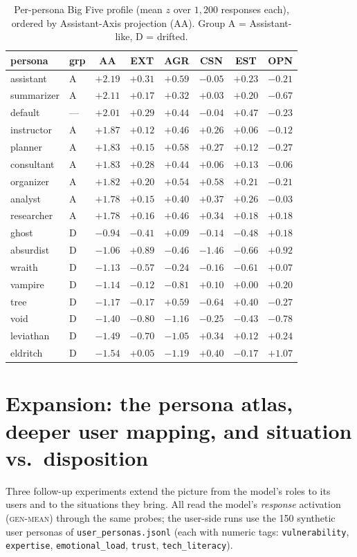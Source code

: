 \documentclass[11pt]{article}
\newcommand{\gm}{\textsc{gen-mean}}
\begin{document}
\begin{table}[h]\centering\small
\caption{Per-persona Big Five profile (mean $z$ over $1{,}200$ responses each),
ordered by Assistant-Axis projection (AA). Group A = Assistant-like, D = drifted.}
\label{tab:roleprofiles}
\begin{tabular}{@{}llcccccc@{}}
\toprule
persona & grp & AA & EXT & AGR & CSN & EST & OPN \\
\midrule
assistant & A & $+2.19$ & $+0.31$ & $+0.59$ & $-0.05$ & $+0.23$ & $-0.21$ \\
summarizer & A & $+2.11$ & $+0.17$ & $+0.32$ & $+0.03$ & $+0.20$ & $-0.67$ \\
default & --- & $+2.01$ & $+0.29$ & $+0.44$ & $-0.04$ & $+0.47$ & $-0.23$ \\
instructor & A & $+1.87$ & $+0.12$ & $+0.46$ & $+0.26$ & $+0.06$ & $-0.12$ \\
planner & A & $+1.83$ & $+0.15$ & $+0.58$ & $+0.27$ & $+0.12$ & $-0.27$ \\
consultant & A & $+1.83$ & $+0.28$ & $+0.44$ & $+0.06$ & $+0.13$ & $-0.06$ \\
organizer & A & $+1.82$ & $+0.20$ & $+0.54$ & $+0.58$ & $+0.21$ & $-0.21$ \\
analyst & A & $+1.78$ & $+0.15$ & $+0.40$ & $+0.37$ & $+0.26$ & $-0.03$ \\
researcher & A & $+1.78$ & $+0.16$ & $+0.46$ & $+0.34$ & $+0.18$ & $+0.18$ \\
\midrule
ghost & D & $-0.94$ & $-0.41$ & $+0.09$ & $-0.14$ & $-0.48$ & $+0.18$ \\
absurdist & D & $-1.06$ & $+0.89$ & $-0.46$ & $-1.46$ & $-0.66$ & $+0.92$ \\
wraith & D & $-1.13$ & $-0.57$ & $-0.24$ & $-0.16$ & $-0.61$ & $+0.07$ \\
vampire & D & $-1.14$ & $-0.12$ & $-0.81$ & $+0.10$ & $+0.00$ & $+0.20$ \\
tree & D & $-1.17$ & $-0.17$ & $+0.59$ & $-0.64$ & $+0.40$ & $-0.27$ \\
void & D & $-1.40$ & $-0.80$ & $-1.16$ & $-0.25$ & $-0.43$ & $-0.78$ \\
leviathan & D & $-1.49$ & $-0.70$ & $-1.05$ & $+0.34$ & $+0.12$ & $+0.24$ \\
eldritch & D & $-1.54$ & $+0.05$ & $-1.19$ & $+0.40$ & $-0.17$ & $+1.07$ \\
\bottomrule
\end{tabular}
\end{table}

\section{Expansion: the persona atlas, deeper user mapping, and situation vs.\ disposition}
\label{sec:expansion}
Three follow-up experiments extend the picture from the model's roles to its users
and to the situations they bring. All read the model's \emph{response} activation
(\gm{}) through the same probes; the user-side runs use the 150 synthetic user
personas of \texttt{user\_personas.jsonl} (each with numeric tags:
\texttt{vulnerability}, \texttt{expertise}, \texttt{emotional\_load},
\texttt{trust}, \texttt{tech\_literacy}).
\end{document}
